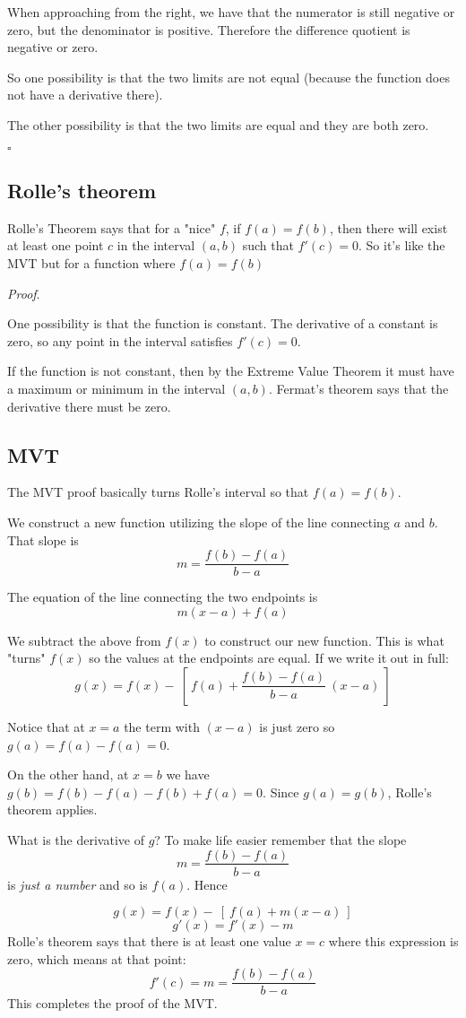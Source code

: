 \documentclass[11pt, oneside]{article}
\begin{document}
When approaching from the right, we have that the numerator is still negative or zero, but the denominator is positive.  Therefore the difference quotient is negative or zero.

So one possibility is that the two limits are not equal (because the function does not have a derivative there).

The other possibility is that the two limits are equal and they are both zero.

$\square$

\subsection*{Rolle's theorem}

Rolle's Theorem says that for a "nice" $f$, if $f(a) = f(b)$, then there will exist at least one point $c$ in the interval $(a,b)$ such that $f'(c) = 0$.  So it's like the MVT but for a function where $f(a) = f(b)$

\emph{Proof}.

One possibility is that the function is constant.   The derivative of a constant is zero, so any point in the interval satisfies $f'(c) = 0$.

If the function is not constant, then by the Extreme Value Theorem it must have a maximum or minimum in the interval $(a,b)$.  Fermat's theorem says that the derivative there must be zero.

\subsection*{MVT}

The MVT proof basically turns Rolle's interval so that $f(a) = f(b)$.

We construct a new function utilizing the slope of the line connecting $a$ and $b$.  That slope is
\[ m = \frac{f(b) - f(a)}{b - a} \]

The equation of the line connecting the two endpoints is
\[ m(x-a) + f(a) \]

We subtract the above from $f(x)$ to construct our new function.  This is what "turns" $f(x)$ so the values at the endpoints are equal.  If we write it out in full:
\[ g(x) = f(x) - \ [ \ f(a) + \frac{f(b) - f(a)}{b - a}  \ (x-a) \ ] \]

Notice that at $x = a$ the term with $(x-a)$ is just zero so $g(a) = f(a) - f(a) = 0$.

On the other hand, at $x = b$ we have $g(b) = f(b) - f(a) - f(b) + f(a) = 0$.  Since $g(a) = g(b)$, Rolle's theorem applies.

What is the derivative of $g$?  To make life easier remember that the slope
\[ m = \frac{f(b) - f(a)}{b - a} \]
is \emph{just a number} and so is $f(a)$.  Hence

\[ g(x) = f(x) - \ [ \ f(a) + m(x-a) \ ] \]
\[ g'(x) = f'(x) - m \]
Rolle's theorem says that there is at least one value $x = c$ where this expression is zero, which means at that point:
\[ f'(c) = m = \frac{f(b) - f(a)}{b - a} \]
This completes the proof of the MVT.
\end{document}
